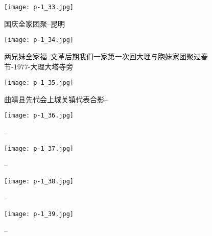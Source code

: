 \clearpage


\begin{figure}
    \begin{center}
        \texttt{[image: p-1\_33.jpg]}
        \caption{国庆全家团聚--昆明}
    \end{center}
\end{figure}

\clearpage


\begin{figure}
    \begin{center}
        \texttt{[image: p-1\_34.jpg]}
        \caption{两兄妹全家福~文革后期我们一家第一次回大理与胞妹家团聚过春节-1977-大理大塔寺旁}
    \end{center}
\end{figure}

\clearpage


\begin{figure}
    \begin{center}
        \texttt{[image: p-1\_35.jpg]}
        \caption{曲靖县先代会上城关镇代表合影--}
    \end{center}
\end{figure}

\clearpage


\begin{figure}
    \begin{center}
        \texttt{[image: p-1\_36.jpg]}
        \caption{--}
    \end{center}
\end{figure}

\clearpage


\begin{figure}
    \begin{center}
        \texttt{[image: p-1\_37.jpg]}
        \caption{--}
    \end{center}
\end{figure}

\clearpage


\begin{figure}
    \begin{center}
        \texttt{[image: p-1\_38.jpg]}
        \caption{--}
    \end{center}
\end{figure}

\clearpage


\begin{figure}
    \begin{center}
        \texttt{[image: p-1\_39.jpg]}
        \caption{--}
    \end{center}
\end{figure}

